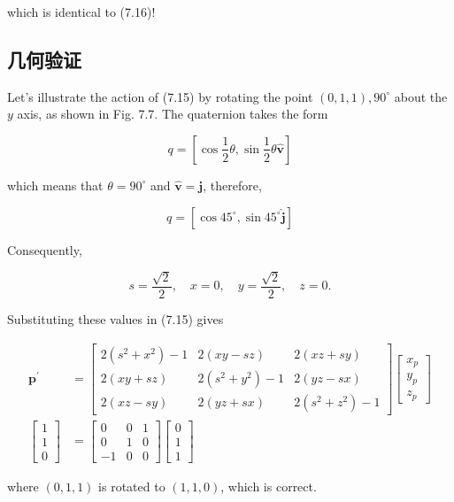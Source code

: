 which is identical to (7.16)!

\subsection{几何验证}
Let's illustrate the action of (7.15) by rotating the point $(0,1,1), 90^{\circ}$ about the $y$ axis, as shown in Fig. 7.7. The quaternion takes the form

$$
q=\left[\cos \frac{1}{2} \theta, \sin \frac{1}{2} \theta \hat{\mathbf{v}}\right]
$$

which means that $\theta=90^{\circ}$ and $\hat{\mathbf{v}}=\mathbf{j}$, therefore,

$$
q=\left[\cos 45^{\circ}, \sin 45^{\circ} \hat{\mathbf{j}}\right]
$$

Consequently,

$$
s=\frac{\sqrt{2}}{2}, \quad x=0, \quad y=\frac{\sqrt{2}}{2}, \quad z=0 .
$$

Substituting these values in (7.15) gives

$$
\begin{aligned}
\mathbf{p}^{\prime} & =\left[\begin{array}{ccc}
2\left(s^{2}+x^{2}\right)-1 & 2(x y-s z) & 2(x z+s y) \\
2(x y+s z) & 2\left(s^{2}+y^{2}\right)-1 & 2(y z-s x) \\
2(x z-s y) & 2(y z+s x) & 2\left(s^{2}+z^{2}\right)-1
\end{array}\right]\left[\begin{array}{l}
x_{p} \\
y_{p} \\
z_{p}
\end{array}\right] \\
{\left[\begin{array}{l}
1 \\
1 \\
0
\end{array}\right] } & =\left[\begin{array}{ccc}
0 & 0 & 1 \\
0 & 1 & 0 \\
-1 & 0 & 0
\end{array}\right]\left[\begin{array}{l}
0 \\
1 \\
1
\end{array}\right]
\end{aligned}
$$

where $(0,1,1)$ is rotated to $(1,1,0)$, which is correct.

